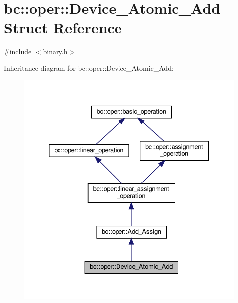 \hypertarget{structbc_1_1oper_1_1Device__Atomic__Add}{}\section{bc\+:\+:oper\+:\+:Device\+\_\+\+Atomic\+\_\+\+Add Struct Reference}
\label{structbc_1_1oper_1_1Device__Atomic__Add}


{\ttfamily \#include $<$binary.\+h$>$}



Inheritance diagram for bc\+:\+:oper\+:\+:Device\+\_\+\+Atomic\+\_\+\+Add\+:\nopagebreak
\begin{figure}[H]
\begin{center}
\leavevmode
\includegraphics[width=332pt]{structbc_1_1oper_1_1Device__Atomic__Add__inherit__graph}
\end{center}
\end{figure}


